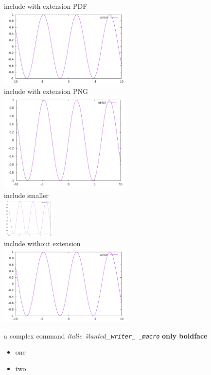 \documentclass[a4paper,%
twoside]{article}
\begin{document}
\begin{center}
  include with extension PDF
  \\
  \includegraphics[width=0.5\textwidth]{F/sin.pdf}
  \\
  include with extension PNG
  \\
  \includegraphics[width=0.5\textwidth]{F/sin.png}
  \\
  include smaller
  \\
  \includegraphics[width=0.2\textwidth]{F/sin.png}
  \\
  include without extension
  \\
  \includegraphics[width=0.5\textwidth]{F/sin}
\end{center}


a complex command
\emph{ital\`ic\textsl{~\~slanted\_\texttt{writer\_%
      \_macro}}}
\textbf{only boldface}

\begin{itemize}%


\item one
\item two
\end{itemize}
\end{document}
